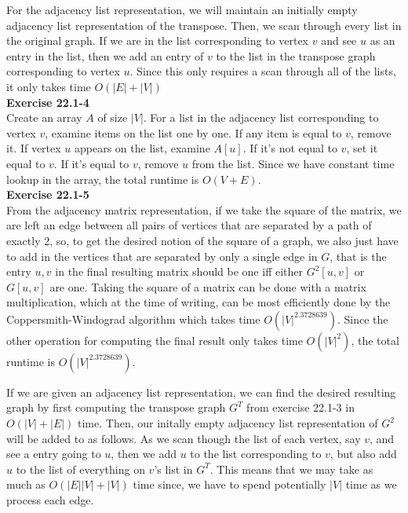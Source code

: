 \documentclass{article}
\begin{document}
For the adjacency list representation, we will maintain an initially empty adjacency list representation of the transpose. Then, we scan through every list in the original graph. If we are in the list corresponding to vertex $v$ and see $u$ as an entry in the list, then we add an entry of $v$ to the list in the transpose graph corresponding to vertex $u$. Since this only requires a scan through all of the lists, it only takes time $O(|E|+|V|)$\\

\noindent\textbf{Exercise 22.1-4}\\

Create an array $A$ of size $|V|$. For a list in the adjacency list corresponding to vertex $v$, examine items on the list one by one.  If any item is equal to $v$, remove it.  If vertex $u$ appears on the list, examine $A[u]$.  If it's not equal to $v$, set it equal to $v$.  If it's equal to $v$, remove $u$ from the list.  Since we have constant time lookup in the array, the total runtime is $O(V+E)$.  \\


\noindent\textbf{Exercise 22.1-5}\\

From the adjacency matrix representation, if we take the square of the matrix, we are left an edge between all pairs of vertices that are separated by a path of exactly 2, so, to get the desired notion of the square of a graph, we also just have to add in the vertices that are separated by only a single edge in $G$, that is the entry $u,v$ in the final resulting matrix should be one iff either $G^2[u,v]$ or $G[u,v]$ are one. Taking the square of a matrix can be done with a matrix multiplication, which at the time of writing, can be most efficiently done by the Coppersmith-Windograd algorithm which takes time $O(|V|^{2.3728639})$. Since the other operation for computing the final result only takes time $O(|V|^2)$, the total runtime is $O(|V|^{2.3728639})$. 

If we are given an adjacency list representation, we can find the desired resulting graph by first computing the transpose graph $G^T$ from exercise 22.1-3 in $O(|V|+|E|)$ time. Then, our initally empty adjacency list representation of $G^2$ will be added to as follows. As we scan though the list of each vertex, say $v$, and see a entry going to $u$, then we add $u$ to the list corresponding to $v$, but also add $u$ to the list of everything on $v$'s list in $G^T$. This means that we may take as much as $O(|E||V|+|V|)$ time since, we have to spend potentially $|V|$ time as we process each edge. \\
\end{document}
